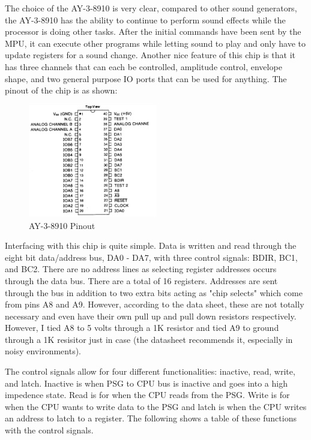 \documentclass[12pt, letterpaper]{article}
\begin{document}
The choice of the AY-3-8910 is very clear, compared to other sound generators, the AY-3-8910 has the ability to continue to perform sound effects while the processor is doing other tasks. After the initial commands have been sent by the MPU, it can execute other programs while letting sound to play and only have to update registers for a sound change.  Another nice feature of this chip is that it has three channels that can each be controlled, amplitude control, envelope shape, and two general purpose IO ports that can be used for anything. The pinout of the chip is as shown:

\begin{figure}[h]
\includegraphics[width=0.5\textwidth, center]{pinout}
\caption{AY-3-8910 Pinout}
\label{fig:pinout_figure}
\end{figure}

Interfacing with this chip is quite simple. Data is written and read through the eight bit data/address bus, DA0 - DA7, with three control signals: BDIR, BC1, and BC2. There are no address lines as selecting register addresses occurs through the data bus. There are a total of 16 registers. Addresses are sent through the bus in addition to two extra bits acting as "chip selects" which come from pins A8 and A9. However, according to the data sheet, these are not totally necessary and even have their own pull up and pull down resistors respectively. However, I tied A8 to 5 volts through a 1K resistor and tied A9 to ground through a 1K resisitor just in case (the datasheet recommends it, especially in noisy environments). 
	
The control signals allow for four different functionalities: inactive, read, write, and latch. Inactive is when PSG to CPU bus is inactive and goes into a high impedence state. Read is for when the CPU reads from the PSG. Write is for when the CPU wants to write data to the PSG and latch is when the CPU writes an address to latch to a register. The following shows a table of these functions with the control signals.
\end{document}
